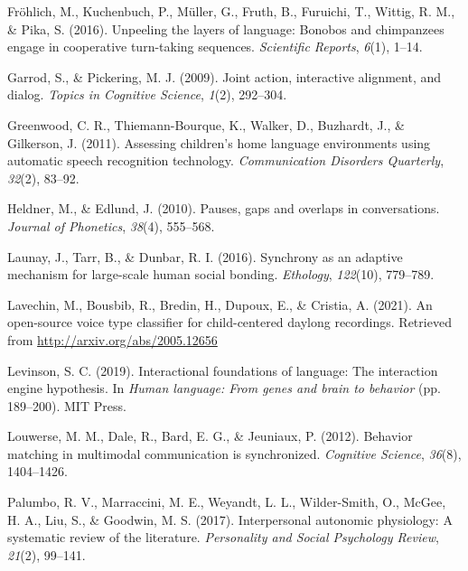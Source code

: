 \documentclass[10pt, letterpaper]{article}
\newenvironment{CSLReferences}%
  {}%
  {\par}
\begin{document}
\begin{CSLReferences}{1}{0}
\leavevmode\hypertarget{ref-frohlich2016unpeeling}{}%
Fröhlich, M., Kuchenbuch, P., Müller, G., Fruth, B., Furuichi, T.,
Wittig, R. M., \& Pika, S. (2016). Unpeeling the layers of language:
Bonobos and chimpanzees engage in cooperative turn-taking sequences.
\emph{Scientific Reports}, \emph{6}(1), 1--14.

\leavevmode\hypertarget{ref-garrod2009joint}{}%
Garrod, S., \& Pickering, M. J. (2009). Joint action, interactive
alignment, and dialog. \emph{Topics in Cognitive Science}, \emph{1}(2),
292--304.

\leavevmode\hypertarget{ref-LENA}{}%
Greenwood, C. R., Thiemann-Bourque, K., Walker, D., Buzhardt, J., \&
Gilkerson, J. (2011). Assessing children's home language environments
using automatic speech recognition technology. \emph{Communication
Disorders Quarterly}, \emph{32}(2), 83--92.

\leavevmode\hypertarget{ref-heldner2010pauses}{}%
Heldner, M., \& Edlund, J. (2010). Pauses, gaps and overlaps in
conversations. \emph{Journal of Phonetics}, \emph{38}(4), 555--568.

\leavevmode\hypertarget{ref-launay2016synchrony}{}%
Launay, J., Tarr, B., \& Dunbar, R. I. (2016). Synchrony as an adaptive
mechanism for large-scale human social bonding. \emph{Ethology},
\emph{122}(10), 779--789.

\leavevmode\hypertarget{ref-lavechin2021vtc}{}%
Lavechin, M., Bousbib, R., Bredin, H., Dupoux, E., \& Cristia, A.
(2021). An open-source voice type classifier for child-centered daylong
recordings. Retrieved from \url{http://arxiv.org/abs/2005.12656}

\leavevmode\hypertarget{ref-levinson2019interactional}{}%
Levinson, S. C. (2019). Interactional foundations of language: The
interaction engine hypothesis. In \emph{Human language: From genes and
brain to behavior} (pp. 189--200). MIT Press.

\leavevmode\hypertarget{ref-louwerse2012behavior}{}%
Louwerse, M. M., Dale, R., Bard, E. G., \& Jeuniaux, P. (2012). Behavior
matching in multimodal communication is synchronized. \emph{Cognitive
Science}, \emph{36}(8), 1404--1426.

\leavevmode\hypertarget{ref-palumbo2017interpersonal}{}%
Palumbo, R. V., Marraccini, M. E., Weyandt, L. L., Wilder-Smith, O.,
McGee, H. A., Liu, S., \& Goodwin, M. S. (2017). Interpersonal autonomic
physiology: A systematic review of the literature. \emph{Personality and
Social Psychology Review}, \emph{21}(2), 99--141.


\end{CSLReferences}
\end{document}
